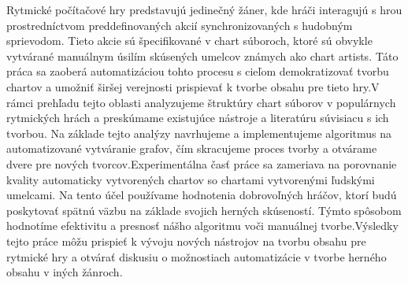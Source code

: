 Rytmické počítačové hry predstavujú jedinečný žáner, kde hráči interagujú s hrou prostredníctvom preddefinovaných akcií synchronizovaných s hudobným sprievodom. Tieto akcie sú špecifikované v chart súboroch, ktoré sú obvykle vytvárané manuálnym úsilím skúsených umelcov známych ako chart artists. Táto práca sa zaoberá automatizáciou tohto procesu s cieľom demokratizovať tvorbu chartov a umožniť širšej verejnosti prispievať k tvorbe obsahu pre tieto hry.V rámci prehľadu tejto oblasti analyzujeme štruktúry chart súborov v populárnych rytmických hrách a preskúmame existujúce nástroje a literatúru súvisiacu s ich tvorbou. Na základe tejto analýzy navrhujeme a implementujeme algoritmus na automatizované vytváranie grafov, čím skracujeme proces tvorby a otvárame dvere pre nových tvorcov.Experimentálna časť práce sa zameriava na porovnanie kvality automaticky vytvorených chartov so chartami vytvorenými ľudskými umelcami. Na tento účel používame hodnotenia dobrovoľných hráčov, ktorí budú poskytovať spätnú väzbu na základe svojich herných skúseností. Týmto spôsobom hodnotíme efektivitu a presnosť nášho algoritmu voči manuálnej tvorbe.Výsledky tejto práce môžu prispieť k vývoju nových nástrojov na tvorbu obsahu pre rytmické hry a otvárať diskusiu o možnostiach automatizácie v tvorbe herného obsahu v iných žánroch.